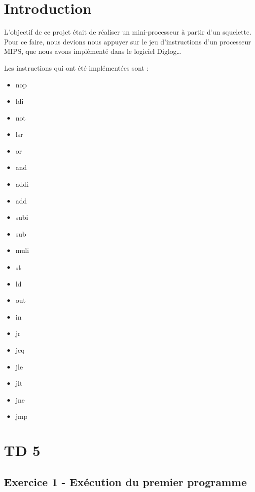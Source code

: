 \documentclass[twoside, 12pt, a4paper]{article}
\begin{document}
\maketitle

\newpage

\section*{Introduction}

L’objectif de ce projet était de réaliser un mini-processeur à partir d'un squelette. Pour ce faire, nous devions
nous appuyer sur le jeu d’instructions d’un processeur MIPS, que nous avons implémenté dans
le logiciel Diglog\ldots

Les instructions qui ont été implémentées sont :
{
\ttfamily
\begin{itemize}
    \item nop
    \item ldi
    \item not
    \item lsr
    \item or
    \item and
    \item addi
    \item add
    \item subi
    \item sub
    \item muli
    \item st
    \item ld
    \item out
    \item in
    \item jr
    \item jeq
    \item jle
    \item jlt
    \item jne
    \item jmp
\end{itemize}
}
\newpage

\tableofcontents

\newpage

\section{TD 5}
    \subsection{Exercice 1 - Exécution du premier programme}
\end{document}
